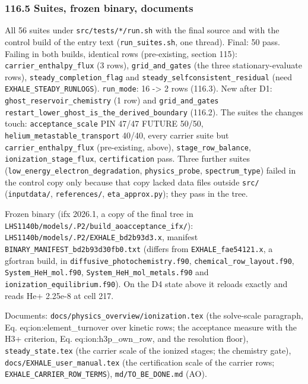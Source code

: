 \documentclass[english,a4paper]{my_memo}
\begin{document}
\subsubsection{116.5 Suites, frozen binary, documents}\label{1165-suites-frozen-binary-documents}

All 56 suites under \texttt{src/tests/*/run.sh} with the final source and with the
control build of the entry text (\texttt{run\_suites.sh}, one thread). Final: 50
pass. Failing in both builds, identical rows (pre-existing, section 115):
\texttt{carrier\_enthalpy\_flux} (3 rows), \texttt{grid\_and\_gates} (the three
stationary-evaluate rows), \texttt{steady\_completion\_flag} and
\texttt{steady\_selfconsistent\_residual} (need \texttt{EXHALE\_STEADY\_RUNLOGS}). \texttt{run\_mode}:
16 -\textgreater{} 2 rows (116.3). New after D1: \texttt{ghost\_reservoir\_chemistry} (1 row) and
\texttt{grid\_and\_gates} \texttt{restart\_lower\_ghost\_is\_the\_derived\_boundary} (116.2). The
suites the changes touch: \texttt{acceptance\_scale} PIN 47/47 FUTURE 50/50,
\texttt{helium\_metastable\_transport} 40/40, every carrier suite but
\texttt{carrier\_enthalpy\_flux} (pre-existing, above), \texttt{stage\_row\_balance},
\texttt{ionization\_stage\_flux}, \texttt{certification} pass. Three further suites
(\texttt{low\_energy\_electron\_degradation}, \texttt{physics\_probe}, \texttt{spectrum\_type}) failed
in the control copy only because that copy lacked data files outside \texttt{src/}
(\texttt{inputdata/}, \texttt{references/}, \texttt{eta\_approx.py}); they pass in the tree.

Frozen binary (ifx 2026.1, a copy of the final tree in
\texttt{LHS1140b/models/.P2/build\_aoacceptance\_ifx/}):
\texttt{LHS1140b/models/.P2/EXHALE\_bd2b93d3.x}, manifest
\texttt{BINARY\_MANIFEST\_bd2b93d30fb0.txt} (differs from \texttt{EXHALE\_fae54121.x}, a
gfortran build, in \texttt{diffusive\_photochemistry.f90}, \texttt{chemical\_row\_layout.f90},
\texttt{System\_HeH\_mol.f90}, \texttt{System\_HeH\_mol\_metals.f90} and
\texttt{ionization\_equilibrium.f90}). On the D4 state above it reloads exactly and
reads He+ 2.25e-8 at cell 217.

Documents: \texttt{docs/physics\_overview/ionization.tex} (the solve-scale paragraph,
Eq. eq:ion:element\_turnover over kinetic rows; the acceptance measure with
the H3+ criterion, Eq. eq:ion:h3p\_own\_row, and the resolution floor),
\texttt{steady\_state.tex} (the carrier scale of the ionized stages; the chemistry
gate), \texttt{docs/EXHALE\_user\_manual.tex} (the certification scale of the carrier
rows; \texttt{EXHALE\_CARRIER\_ROW\_TERMS}), \texttt{md/TO\_BE\_DONE.md} (AO).
\end{document}
